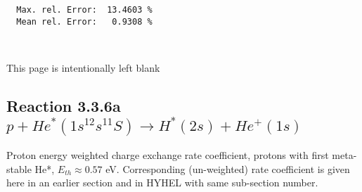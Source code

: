 \documentclass[12pt,dvipdfmx]{article}
\begin{document}
\begin{small}
\begin{verbatim}
  Max. rel. Error:  13.4603 %
  Mean rel. Error:   0.9308 %



\end{verbatim}\end{small}

\newpage
This page is intentionally left blank
\newpage

\subsection{
Reaction 3.3.6a $   p + He^*(1s^12s^11S) \rightarrow H^*(2s) + He^+(1s) $
}
Proton energy weighted charge exchange rate coefficient,
protons with first meta-stable He*, $E_{th} \approx 0.57$ eV.
Corresponding (un-weighted) rate coefficient is given here in an earlier section and in HYHEL with same sub-section number.
\end{document}
